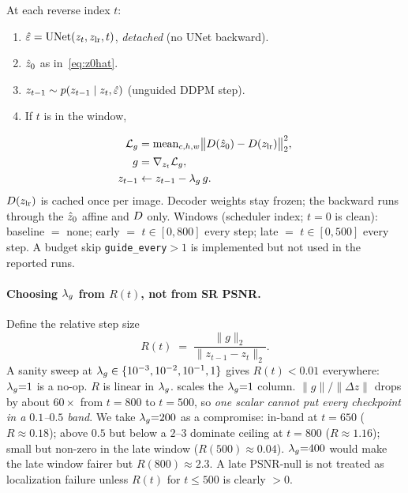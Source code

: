 At each reverse index $t$:
\begin{enumerate}
  \item $\hat{\varepsilon}=\mathrm{UNet}(z_{t},z_{\mathrm{lr}},t)$, \emph{detached}
        (no UNet backward).
  \item $\hat{z}_{0}$ as in~\eqref{eq:z0hat}.
  \item $z_{t-1}\sim p(z_{t-1}\mid z_{t},\hat{\varepsilon})$ (unguided DDPM step).
  \item If $t$ is in the window,
\end{enumerate}
\begin{equation}
  \label{eq:guide}
  \begin{aligned}
    \mathcal{L}_g
    &=
    \mathrm{mean}_{c,h,w}\bigl\lVert D(\hat{z}_{0})-D(z_{\mathrm{lr}})\bigr\rVert_2^2, \\
    g
    &=
    \nabla_{z_{t}}\mathcal{L}_g, \\
    z_{t-1}
    &\leftarrow
    z_{t-1}-\lambda_{g}\, g.
  \end{aligned}
\end{equation}
$D(z_{\mathrm{lr}})$ is cached once per image.
Decoder weights stay frozen; the backward runs through the
$\hat{z}_{0}$ affine and $D$ only.
Windows (scheduler index; $t{=}0$ is clean):
baseline $=$ none;
early $=$ $t\in[0,800]$ every step;
late $=$ $t\in[0,500]$ every step.
A budget skip \texttt{guide\_every}$>1$ is implemented but not used
in the reported runs.

\paragraph{Choosing $\lambda_{g}$ from $R(t)$, not from SR PSNR.}
Define the relative step size
\begin{equation}
  \label{eq:Rt}
  R(t) \;=\; \frac{\lVert g\rVert_2}{\lVert z_{t-1}-z_t\rVert_2}.
\end{equation}
A sanity sweep at $\lambda_{g}\in\{10^{-3},10^{-2},10^{-1},1\}$ gives
$R(t)<0.01$ everywhere: $\lambda_{g}{=}1$ is a no-op.
$R$ is linear in $\lambda_{g}$.
 scales the $\lambda_{g}{=}1$ column.
$\lVert g\rVert/\lVert\Delta z\rVert$ drops by about $60\times$ from
$t{=}800$ to $t{=}500$, so \emph{one scalar cannot put every
checkpoint in a $0.1$--$0.5$ band}.
We take $\lambda_{g}{=}200$ as a compromise: in-band at $t{=}650$
($R{\approx}0.18$); above $0.5$ but below a $2$--$3$ dominate
ceiling at $t{=}800$ ($R{\approx}1.16$); small but non-zero in the
late window ($R(500){\approx}0.04$).
$\lambda_{g}{=}400$ would make the late window fairer but
$R(800){\approx}2.3$.
A late PSNR-null is not treated as localization failure unless
$R(t)$ for $t\le 500$ is clearly $>0$.

